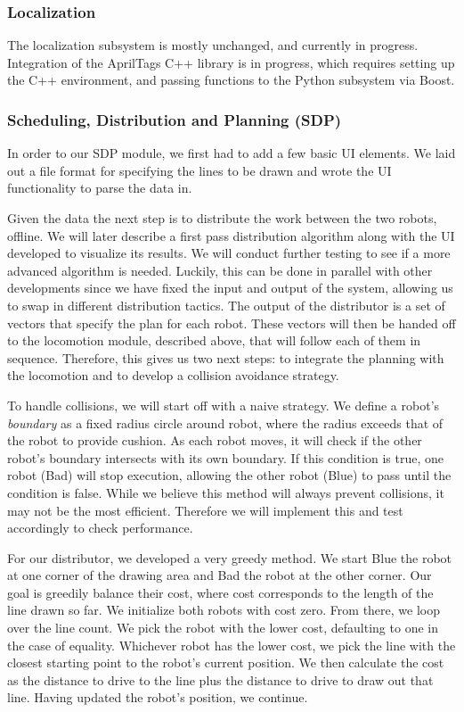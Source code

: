 \subsubsection{Localization}
The localization subsystem is mostly unchanged, and currently in progress. Integration of the AprilTags C++ library is in progress, which requires setting up the C++ environment, and passing functions to the Python subsystem via Boost.

\subsubsection{Scheduling, Distribution and Planning (SDP)}

In order to our SDP module, we first had to add a few basic UI elements. We laid out a file format for specifying the lines to be drawn and wrote the UI functionality to parse the data in.

Given the data the next step is to distribute the work between the two robots, offline. We will later describe a first pass distribution algorithm along with the UI developed to visualize its results. We will conduct further testing to see if a more advanced algorithm is needed. Luckily, this can be done in parallel with other developments since we have fixed the input and output of the system, allowing us to swap in different distribution tactics. The output of the distributor is a set of vectors that specify the plan for each robot. These vectors will then be handed off to the locomotion module, described above, that will follow each of them in sequence. Therefore, this gives us two next steps: to integrate the planning with the locomotion and to develop a collision avoidance strategy.

To handle collisions, we will start off with a naive strategy. We define a robot's \textit{boundary} as a fixed radius circle around robot, where the radius exceeds that of the robot to provide cushion. As each robot moves, it will check if the other robot's boundary intersects with its own boundary. If this condition is true, one robot (Bad) will stop execution, allowing the other robot (Blue) to pass until the condition is false. While we believe this method will always prevent collisions, it may not be the most efficient. Therefore we will implement this and test accordingly to check performance.

For our distributor, we developed a very greedy method. We start Blue the robot at one corner of the drawing area and Bad the robot at the other corner. Our goal is greedily balance their cost, where cost corresponds to the length of the line drawn so far. We initialize both robots with cost zero. From there, we loop over the line count. We pick the robot with the lower cost, defaulting to one in the case of equality. Whichever robot has the lower cost, we pick the line with the closest starting point to the robot's current position. We then calculate the cost as the distance to drive to the line plus the distance to drive to draw out that line. Having updated the robot's position, we continue. 

